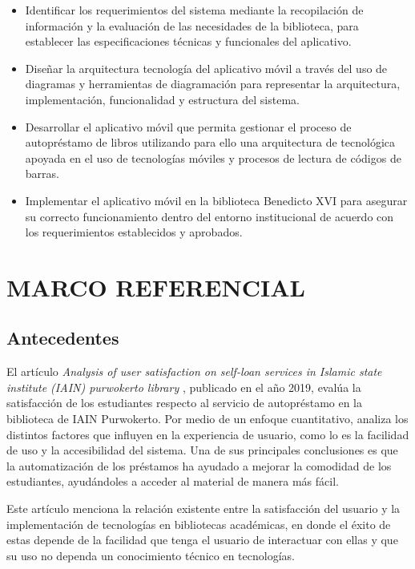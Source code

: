 \documentclass[spanish]{ieee_upb}
\begin{document}
\begin{itemize}
\item Identificar los requerimientos del sistema mediante la recopilación de información y la evaluación de las necesidades de la biblioteca, para establecer las especificaciones técnicas y funcionales del aplicativo.   
\item Diseñar la arquitectura tecnología del aplicativo móvil a través del uso de diagramas y herramientas de diagramación para representar la arquitectura, implementación, funcionalidad y estructura del sistema.
\item Desarrollar el aplicativo móvil que permita gestionar el proceso de autopréstamo de libros utilizando para ello una arquitectura de tecnológica apoyada en el uso de tecnologías móviles y procesos de lectura de códigos de barras.
\item Implementar el aplicativo móvil en la biblioteca Benedicto XVI para asegurar su correcto funcionamiento dentro del entorno institucional de acuerdo con los requerimientos establecidos y aprobados.

\end{itemize}

\newpage
\section{MARCO REFERENCIAL}

\subsection{Antecedentes}
El artículo \textit{Analysis of user satisfaction on self-loan services in Islamic state institute (IAIN) purwokerto library} \cite{antasaria2019analysis} , publicado en el año 2019, evalúa la satisfacción de los estudiantes respecto al servicio de autopréstamo en la biblioteca de IAIN Purwokerto. Por medio de un enfoque cuantitativo, analiza los distintos factores que influyen en la experiencia de usuario, como lo es la facilidad de uso y la accesibilidad del sistema. Una de sus principales conclusiones es que la automatización de los préstamos ha ayudado a mejorar la comodidad de los estudiantes, ayudándoles a acceder al material de manera más fácil. 
\vspace{0.3 cm}

Este artículo menciona la relación existente entre la satisfacción del usuario y la implementación de tecnologías en bibliotecas académicas, en donde el éxito de estas depende de la facilidad que tenga el usuario de interactuar con ellas y que su uso no dependa un conocimiento técnico en tecnologías. 
\vspace{0.3 cm}
\end{document}
